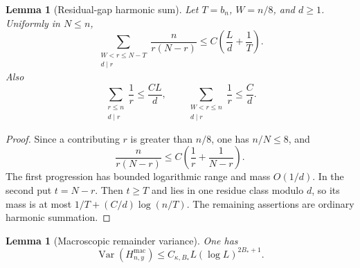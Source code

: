 \documentclass[11pt]{article}
\newtheorem{lemma}[theorem]{Lemma}
\theoremstyle{remark}
\newcommand{\Var}{\operatorname{Var}}
\begin{document}
\begin{lemma}[Residual-gap harmonic sum]
\label{lem:residual-gap-sum}
Let $T=b_n$, $W=n/8$, and $d\ge1$.  Uniformly in $N\le n$,
\[
 \sum_{\substack{W<r\le N-T\\d\mid r}}
 \frac{n}{r(N-r)}
 \le C\left(\frac Ld+\frac1T\right).
\]
Also
\[
 \sum_{\substack{r\le n\\d\mid r}}\frac1r\le\frac{CL}{d},
 \qquad
 \sum_{\substack{W<r\le n\\d\mid r}}\frac1r\le\frac C d.
\]
\end{lemma}

\begin{proof}
Since a contributing $r$ is greater than $n/8$, one has $n/N\le8$, and
\[
 \frac{n}{r(N-r)}\le C\left(\frac1r+\frac1{N-r}\right).
\]
The first progression has bounded logarithmic range and mass $O(1/d)$.  In
the second put $t=N-r$.  Then $t\ge T$ and lies in one residue class modulo
$d$, so its mass is at most $1/T+(C/d)\log(n/T)$.  The remaining assertions
are ordinary harmonic summation.
\end{proof}

\begin{lemma}[Macroscopic remainder variance]
\label{lem:macro-H-variance}
One has
\[
 \Var(H_{n,y}^{\mathrm{mac}})
 \le C_{\kappa,B_*}L(\log L)^{2B_*+1}.
\]
\end{lemma}
\end{document}
